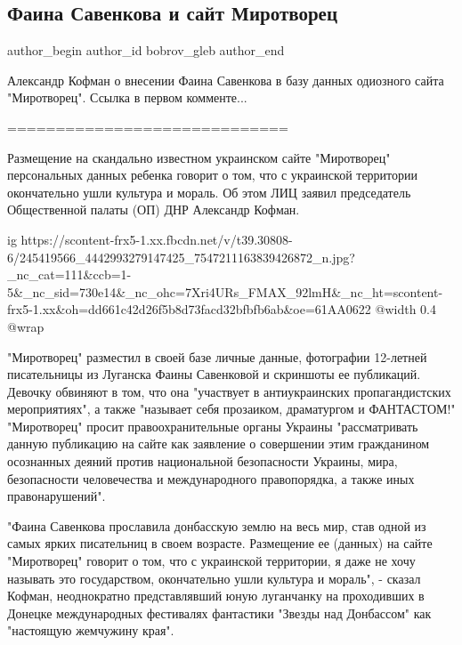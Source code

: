 
 
 
 
 
 
\subsection{Фаина Савенкова и сайт Миротворец}
\label{sec:16_10_2021.fb.bobrov_gleb.1.savenkova_sajt_mirotvorec}
 
\ifcmt
 author_begin
   author_id bobrov_gleb
 author_end
\fi

Александр Кофман о внесении Фаина Савенкова в базу данных одиозного сайта
"Миротворец". Ссылка в первом комменте...

=============================

Размещение на скандально известном украинском сайте "Миротворец" персональных
данных ребенка говорит о том, что с украинской территории окончательно ушли
культура и мораль. Об этом ЛИЦ заявил председатель Общественной палаты (ОП) ДНР
Александр Кофман.

\ifcmt
  ig https://scontent-frx5-1.xx.fbcdn.net/v/t39.30808-6/245419566_4442993279147425_7547211163839426872_n.jpg?_nc_cat=111&ccb=1-5&_nc_sid=730e14&_nc_ohc=7Xri4URs_FMAX_92lmH&_nc_ht=scontent-frx5-1.xx&oh=dd661c42d26f5b8d73facd32bfbfb6ab&oe=61AA0622
  @width 0.4
  @wrap 
\fi

"Миротворец" разместил в своей базе личные данные, фотографии 12-летней
писательницы из Луганска Фаины Савенковой и скриншоты ее публикаций. Девочку
обвиняют в том, что она "участвует в антиукраинских пропагандистских
мероприятиях", а также "называет себя прозаиком, драматургом и ФАНТАСТОМ!"
"Миротворец" просит правоохранительные органы Украины "рассматривать данную
публикацию на сайте как заявление о совершении этим гражданином осознанных
деяний против национальной безопасности Украины, мира, безопасности
человечества и международного правопорядка, а также иных правонарушений".

"Фаина Савенкова прославила донбасскую землю на весь мир, став одной из самых
ярких писательниц в своем возрасте. Размещение ее (данных) на сайте
"Миротворец" говорит о том, что с украинской территории, я даже не хочу
называть это государством, окончательно ушли культура и мораль", - сказал
Кофман, неоднократно представлявший юную луганчанку на проходивших в Донецке
международных фестивалях фантастики "Звезды над Донбассом" как "настоящую
жемчужину края".

